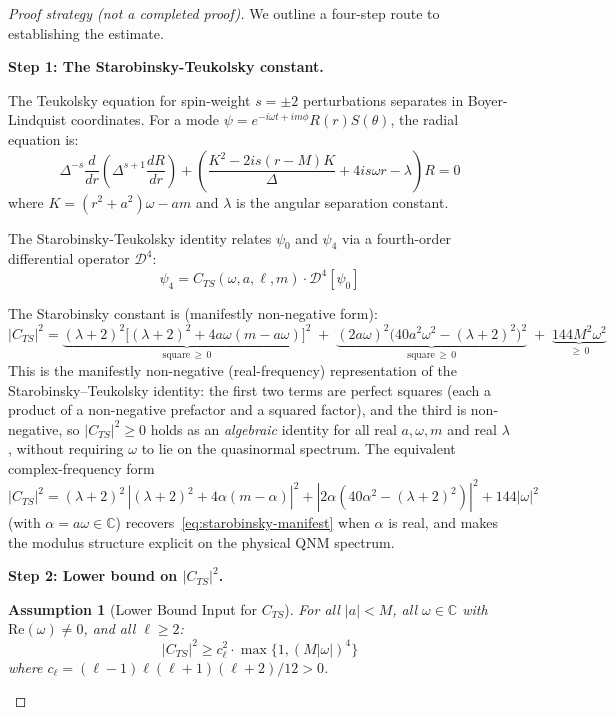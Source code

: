 \documentclass[12pt,a4paper]{article}
\newtheorem{assumption}[theorem]{Assumption}
\begin{document}
\begin{proof}[Proof strategy (not a completed proof)]
We outline a four-step route to establishing the estimate.

\textbf{Step 1: The Starobinsky-Teukolsky constant.}

The Teukolsky equation for spin-weight $s = \pm 2$ perturbations separates in Boyer-Lindquist coordinates. For a mode $\psi = e^{-i\omega t + im\phi} R(r) S(\theta)$, the radial equation is:
\begin{equation}
\Delta^{-s}\frac{d}{dr}\left(\Delta^{s+1}\frac{dR}{dr}\right) + \left(\frac{K^2 - 2is(r-M)K}{\Delta} + 4is\omega r - \lambda\right)R = 0
\end{equation}
where $K = (r^2 + a^2)\omega - am$ and $\lambda$ is the angular separation constant.

The Starobinsky-Teukolsky identity relates $\psi_0$ and $\psi_4$ via a fourth-order differential operator $\mathcal{D}^4$:
\begin{equation}
\psi_4 = C_{TS}(\omega, a, \ell, m) \cdot \mathcal{D}^4[\psi_0]
\end{equation}

The Starobinsky constant is (manifestly non-negative form):
\begin{equation}\label{eq:starobinsky-manifest}
|C_{TS}|^2 = \underbrace{(\lambda + 2)^2\big[(\lambda + 2)^2 + 4a\omega(m - a\omega)\big]^2}_{\text{square} \,\geq\, 0} \;+\; \underbrace{(2a\omega)^2\big(40a^2\omega^2 - (\lambda + 2)^2\big)^2}_{\text{square} \,\geq\, 0} \;+\; \underbrace{144M^2\omega^2}_{\geq\, 0}
\end{equation}
This is the manifestly non-negative (real-frequency) representation of the Starobinsky--Teukolsky identity: the first two terms are perfect squares (each a product of a non-negative prefactor and a squared factor), and the third is non-negative, so $|C_{TS}|^2 \geq 0$ holds as an \emph{algebraic} identity for all real $a,\omega,m$ and real $\lambda$, without requiring $\omega$ to lie on the quasinormal spectrum.  The equivalent complex-frequency form $|C_{TS}|^2 = (\lambda+2)^2\,|(\lambda+2)^2 + 4\alpha(m-\alpha)|^2 + |2\alpha(40\alpha^2 - (\lambda+2)^2)|^2 + 144|\omega|^2$ (with $\alpha = a\omega \in \mathbb{C}$) recovers~\eqref{eq:starobinsky-manifest} when $\alpha$ is real, and makes the modulus structure explicit on the physical QNM spectrum.

\textbf{Step 2: Lower bound on $|C_{TS}|^2$.}

\begin{assumption}[Lower Bound Input for $C_{TS}$]\label{lem:CTS-lower}
For all $|a| < M$, all $\omega \in \mathbb{C}$ with $\text{Re}(\omega) \neq 0$, and all $\ell \geq 2$:
\begin{equation}
|C_{TS}|^2 \geq c_\ell^2 \cdot \max\{1, (M|\omega|)^4\}
\end{equation}
where $c_\ell = (\ell - 1)\ell(\ell + 1)(\ell + 2)/12 > 0$.
\end{assumption}


\end{proof}
\end{document}

